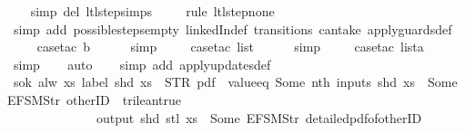 \begin{isabellebody}
\ \ \isamarkupfalse%
\ {\isacharparenleft}simp\ del{\isacharcolon}\ ltl{\isacharunderscore}step{\isachardot}simps{\isacharparenright}\isanewline
\ \ \ \isamarkupfalse%
\ {\isacharparenleft}rule\ ltl{\isacharunderscore}step{\isacharunderscore}none{\isacharparenright}\isanewline
\ \ \ \isamarkupfalse%
\ {\isacharparenleft}simp\ add{\isacharcolon}\ possible{\isacharunderscore}steps{\isacharunderscore}empty\ linkedIn{\isacharunderscore}def\ transitions\ can{\isacharunderscore}take\ apply{\isacharunderscore}guards{\isacharunderscore}def{\isacharparenright}\isanewline
\ \ \ \isamarkupfalse%
\ {\isacharparenleft}case{\isacharunderscore}tac\ b{\isacharparenright}\isanewline
\ \ \ \ \isamarkupfalse%
\ simp\isanewline
\ \ \ \isamarkupfalse%
\ {\isacharparenleft}case{\isacharunderscore}tac\ list{\isacharparenright}\isanewline
\ \ \ \ \isamarkupfalse%
\ simp\isanewline
\ \ \ \isamarkupfalse%
\ {\isacharparenleft}case{\isacharunderscore}tac\ lista{\isacharparenright}\isanewline
\ \ \ \ \isamarkupfalse%
\ simp\isanewline
\ \ \isamarkupfalse%
\ auto{\isacharbrackleft}{}{\isacharbrackright}\isanewline
\ \ \isamarkupfalse%
\ {\isacharparenleft}simp\ add{\isacharcolon}\ apply{\isacharunderscore}updates{\isacharunderscore}def{\isacharparenright}%
\endisatagproof
{\isafoldproof}%
%
\isadelimproof
\isanewline
%
\endisadelimproof
\isanewline
{}\isamarkupfalse%
\ s{}{\isacharunderscore}ok{\isacharcolon}\ {\isachardoublequoteopen}alw\ {\isacharparenleft}{\isasymlambda}xs{\isachardot}\ label\ {\isacharparenleft}shd\ xs{\isacharparenright}\ {\isacharequal}\ STR\ {\isacharprime}{\isacharprime}pdf{\isacharprime}{\isacharprime}\ {\isasymand}\ value{\isacharunderscore}eq\ {\isacharparenleft}Some\ {\isacharparenleft}nth\ {\isacharparenleft}inputs\ {\isacharparenleft}shd\ xs{\isacharparenright}{\isacharparenright}\ {}{\isacharparenright}{\isacharparenright}\ {\isacharparenleft}Some\ {\isacharparenleft}EFSM{\isachardot}Str\ {\isacharprime}{\isacharprime}otherID{\isacharprime}{\isacharprime}{\isacharparenright}{\isacharparenright}\ {\isacharequal}\ trilean{\isachardot}true\ {\isasymlongrightarrow}\isanewline
\ \ \ \ \ \ \ \ \ \ \ \ \ \ output\ {\isacharparenleft}shd\ {\isacharparenleft}stl\ xs{\isacharparenright}{\isacharparenright}\ {\isasymnoteq}\ {\isacharbrackleft}Some\ {\isacharparenleft}EFSM{\isachardot}Str\ {\isacharprime}{\isacharprime}detailed{\isacharunderscore}pdf{\isacharunderscore}of{\isacharunderscore}otherID{\isacharprime}{\isacharprime}{\isacharparenright}{\isacharbrackright}{\isacharparenright}\isanewline

\end{isabellebody}
